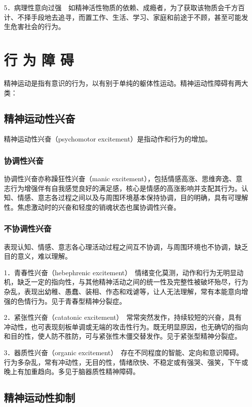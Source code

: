 5．病理性意向过强　如精神活性物质的依赖、成瘾者，为了获取该物质会千方百计、不择手段地去追寻，而置工作、生活、学习、家庭和前途于不顾，甚至可能发生危害社会的行为。

\section{行 为 障 碍}

精神运动是指有意识的行为，以有别于单纯的躯体性运动。精神运动性障碍有两大类：

\subsection{精神运动性兴奋}

精神运动性兴奋（psychomotor excitement）是指动作和行为的增加。

\subsubsection{协调性兴奋}

协调性兴奋亦称躁狂性兴奋（manic
excitement），包括情感高涨、思维奔逸、意志行为增强伴有自我感觉良好的满足感，核心是情感的高涨影响并支配其行为。认知、情感、意志各过程之间以及与周围环境基本保持协调，目的明确，具有可理解性。焦虑激动时的兴奋和轻度的销魂状态也属协调性兴奋。

\subsubsection{不协调性兴奋}

表现认知、情感、意志各心理活动过程之间互不协调，与周围环境也不协调，缺乏目的意义，难以理解。

1．青春性兴奋（hebephrenic
excitement）　情绪变化莫测，动作和行为无明显动机，缺乏一定的指向性，与其他精神活动之间的统一性及完整性被破坏殆尽，行为杂乱，表现出幼稚、愚蠢、装相、作态和戏谑等，让人无法理解，常有本能意向增强的色情行为。见于青春型精神分裂症。

2．紧张性兴奋（catatonic
excitement）　常常突然发作，持续较短的兴奋，具有冲动性，也可表现刻板单调或无端的攻击性行为。既无明显原因，也无确切的指向和目的性，使人防不胜防，可与紧张性木僵交替发作。见于紧张型精神分裂症。

3．器质性兴奋（organic
excitement）　存在不同程度的智能、定向和意识障碍。行为多杂乱，常有冲动性，无目的性，情绪欣快、不稳定或有强哭、强笑，下午或晚上有加重趋向。多见于脑器质性精神障碍。

\subsection{精神运动性抑制}

